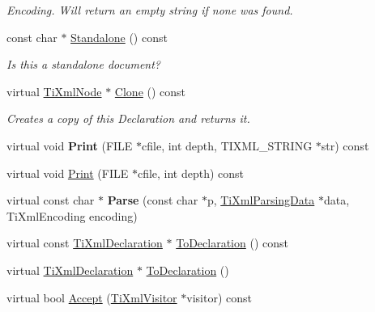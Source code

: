 \begin{DoxyCompactItemize}
\begin{DoxyCompactList}\small\item\em \-Encoding. \-Will return an empty string if none was found. \end{DoxyCompactList}\item 
\hypertarget{class_ti_xml_declaration_a9ff06afc033d7ef730ec7c6825b97ad9}{
const char $\ast$ \hyperlink{class_ti_xml_declaration_a9ff06afc033d7ef730ec7c6825b97ad9}{\-Standalone} () const }
\label{class_ti_xml_declaration_a9ff06afc033d7ef730ec7c6825b97ad9}

\begin{DoxyCompactList}\small\item\em \-Is this a standalone document? \end{DoxyCompactList}\item 
\hypertarget{class_ti_xml_declaration_aff8231266d735943d8a7514a9c9822b9}{
virtual \hyperlink{class_ti_xml_node}{\-Ti\-Xml\-Node} $\ast$ \hyperlink{class_ti_xml_declaration_aff8231266d735943d8a7514a9c9822b9}{\-Clone} () const }
\label{class_ti_xml_declaration_aff8231266d735943d8a7514a9c9822b9}

\begin{DoxyCompactList}\small\item\em \-Creates a copy of this \-Declaration and returns it. \end{DoxyCompactList}\item 
\hypertarget{class_ti_xml_declaration_aa5ab32ec19d4eeecff4a9238c6c90565}{
virtual void {\bfseries \-Print} (\-F\-I\-L\-E $\ast$cfile, int depth, \-T\-I\-X\-M\-L\-\_\-\-S\-T\-R\-I\-N\-G $\ast$str) const }
\label{class_ti_xml_declaration_aa5ab32ec19d4eeecff4a9238c6c90565}

\item 
virtual void \hyperlink{class_ti_xml_declaration_abf6303db4bd05b5be554036817ff1cb4}{\-Print} (\-F\-I\-L\-E $\ast$cfile, int depth) const 
\item 
\hypertarget{class_ti_xml_declaration_a9839ea97ed687a2b7342fd7b0f04361b}{
virtual const char $\ast$ {\bfseries \-Parse} (const char $\ast$p, \hyperlink{class_ti_xml_parsing_data}{\-Ti\-Xml\-Parsing\-Data} $\ast$data, \-Ti\-Xml\-Encoding encoding)}
\label{class_ti_xml_declaration_a9839ea97ed687a2b7342fd7b0f04361b}

\item 
virtual const \hyperlink{class_ti_xml_declaration}{\-Ti\-Xml\-Declaration} $\ast$ \hyperlink{class_ti_xml_declaration_a1e085d3fefd1dbf5ccdbff729931a967}{\-To\-Declaration} () const 
\item 
virtual \hyperlink{class_ti_xml_declaration}{\-Ti\-Xml\-Declaration} $\ast$ \hyperlink{class_ti_xml_declaration_a6bd3d1daddcaeb9543c24bfd090969ce}{\-To\-Declaration} ()
\item 
virtual bool \hyperlink{class_ti_xml_declaration_ab6a6b178161ba9abc2c35058de689864}{\-Accept} (\hyperlink{class_ti_xml_visitor}{\-Ti\-Xml\-Visitor} $\ast$visitor) const 
\end{DoxyCompactItemize}
